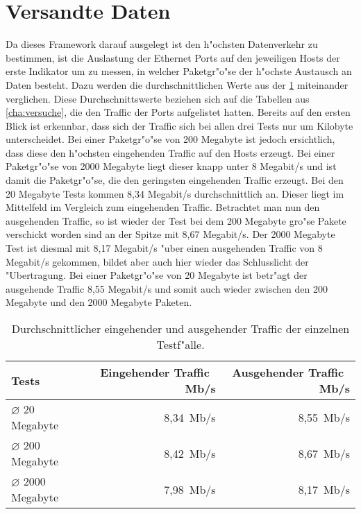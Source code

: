 \section{Versandte Daten}
\label{sec:verschickteDaten}
Da dieses Framework darauf ausgelegt ist den h"ochsten Datenverkehr zu bestimmen, ist die %
Auslastung der Ethernet Ports auf den jeweiligen Hosts der erste Indikator um zu messen, %
in welcher Paketgr"o"se der h"ochste Austausch an Daten besteht. Dazu werden die durchschnittlichen %
Werte aus der \cref{tab:compTraffic} miteinander verglichen. Diese Durchschnittswerte beziehen sich %
auf die Tabellen aus \cref{cha:versuche}, die den Traffic der Ports aufgelistet hatten. Bereits %
auf den ersten Blick ist erkennbar, dass sich der Traffic sich bei allen drei Tests nur um Kilobyte unterscheidet. %
Bei einer Paketgr"o"se von 200 Megabyte ist jedoch ersichtlich, dass diese den h"ochsten eingehenden %
Traffic auf den Hosts erzeugt. Bei einer Paketgr"o"se von 2000 Megabyte liegt dieser knapp unter %
8 Megabit/s und ist damit die Paketgr"o"se, die den geringsten eingehenden Traffic erzeugt. Bei %
den 20 Megabyte Tests kommen 8,34 Megabit/s durchschnittlich an. Dieser liegt im Mittelfeld %
im Vergleich zum eingehenden Traffic. Betrachtet man nun den ausgehenden Traffic, so ist wieder %
der Test bei dem 200 Megabyte gro"se Pakete verschickt worden sind an der Spitze mit 8,67 %
Megabit/s. Der 2000 Megabyte Test ist diesmal mit 8,17 Megabit/s "uber einen ausgehenden %
Traffic von 8 Megabit/s gekommen, bildet aber auch hier wieder das Schlusslicht der "Ubertragung. %
Bei einer Paketgr"o"se von 20 Megabyte ist betr"agt der ausgehende Traffic 8,55 Megabit/s und %
somit auch wieder zwischen den 200 Megabyte und den 2000 Megabyte Paketen. %

\begin{table}
\centering
\begin{tabular}{l%
 r<{\,Mb/s}%
 r<{\,Mb/s}%
}
Tests  					& Eingehender Traffic	& Ausgehender Traffic	\\
\hline
$\diameter$ \hspace{8pt} 20 Megabyte  	& 8,34			& 8,55 			\\
$\diameter$ \hspace{6pt}200 Megabyte  	& 8,42			& 8,67			\\
$\diameter$ 2000 Megabyte	  	& 7,98			& 8,17			\\
\end{tabular}
\caption{Durchschnittlicher eingehender und ausgehender Traffic der einzelnen Testf"alle.}
\label{tab:compTraffic}

\end{table}

